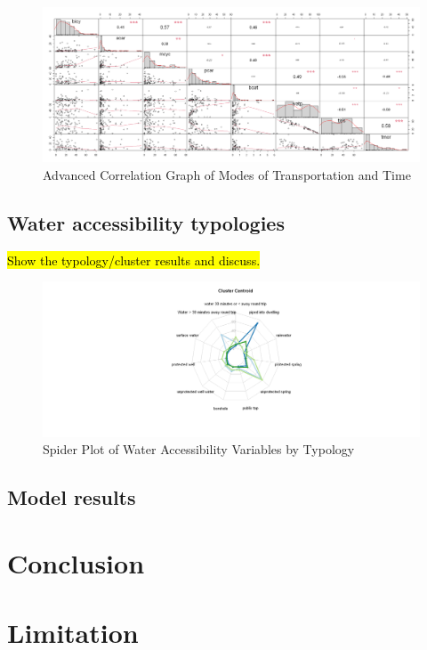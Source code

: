 \documentclass[10pt,twoside]{article}
\numberwithin{equation}{section}
\newcommand{\?}{\stackrel{?}{=}}
\begin{document}
\begin{figure}[h!]
  \centering
  \includegraphics[width=.7\textwidth]{transportation-time}
  \caption{Advanced Correlation Graph of Modes of Transportation and Time}
  \label{fig:year}
\end{figure}

\subsection*{Water accessibility typologies}
\hl{Show the typology/cluster results and discuss.}

\begin{figure}[h!]
  \centering
  \includegraphics[width=.7\textwidth]{spider-plot}
  \caption{Spider Plot of Water Accessibility Variables by Typology}
  \label{fig:spider}
\end{figure}
\subsection*{Model results}


\section*{Conclusion}

\section*{Limitation}

\printbibliography
\end{document}
